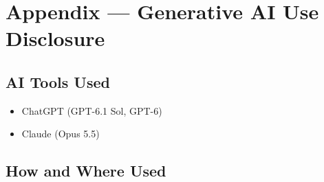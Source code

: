 \documentclass[10pt,titlepage]{article}
\begin{document}
\newpage{}

\section{Appendix --- Generative AI Use Disclosure}

\subsection{AI Tools Used}

\begin{itemize}
    \item ChatGPT (GPT-6.1 Sol, GPT-6)
    \item Claude (Opus 5.5)
\end{itemize}

\subsection{How and Where Used}
\end{document}
